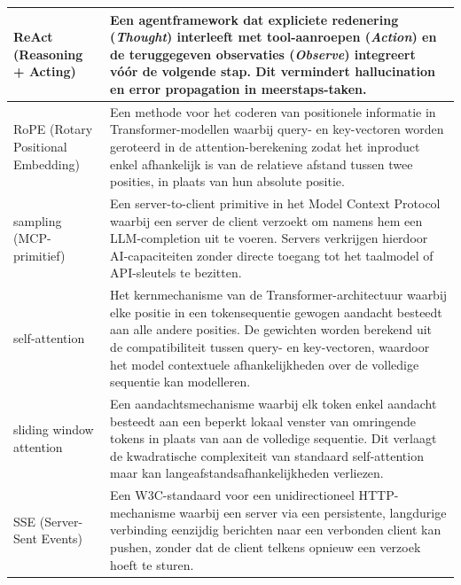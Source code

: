 \begin{longtable}{p{} p{}}
ReAct \newline \small(Reasoning + Acting) &
    Een agentframework dat expliciete redenering (\emph{Thought}) interleeft met tool-aanroepen (\emph{Action}) en de teruggegeven observaties (\emph{Observe}) integreert vóór de volgende stap. Dit vermindert hallucination en error propagation in meerstaps-taken. \\
\midrule


RoPE \newline \small(Rotary Positional Embedding) &
    Een methode voor het coderen van positionele informatie in Transformer-modellen waarbij query- en key-vectoren worden geroteerd in de attention-berekening zodat het inproduct enkel afhankelijk is van de relatieve afstand tussen twee posities, in plaats van hun absolute positie. \\
\midrule

sampling \newline \small(MCP-primitief) &
    Een server-to-client primitive in het Model Context Protocol waarbij een server de client verzoekt om namens hem een LLM-completion uit te voeren. Servers verkrijgen hierdoor AI-capaciteiten zonder directe toegang tot het taalmodel of API-sleutels te bezitten. \\
\midrule

self-attention &
    Het kernmechanisme van de Transformer-architectuur waarbij elke positie in een tokensequentie gewogen aandacht besteedt aan alle andere posities. De gewichten worden berekend uit de compatibiliteit tussen query- en key-vectoren, waardoor het model contextuele afhankelijkheden over de volledige sequentie kan modelleren. \\
\midrule

sliding window attention &
    Een aandachtsmechanisme waarbij elk token enkel aandacht besteedt aan een beperkt lokaal venster van omringende tokens in plaats van aan de volledige sequentie. Dit verlaagt de kwadratische complexiteit van standaard self-attention maar kan langeafstandsafhankelijkheden verliezen. \\
\midrule

SSE \newline \small(Server-Sent Events) &
    Een W3C-standaard voor een unidirectioneel HTTP-mechanisme waarbij een server via een persistente, langdurige verbinding eenzijdig berichten naar een verbonden client kan pushen, zonder dat de client telkens opnieuw een verzoek hoeft te sturen. \\
\midrule


\end{longtable}
